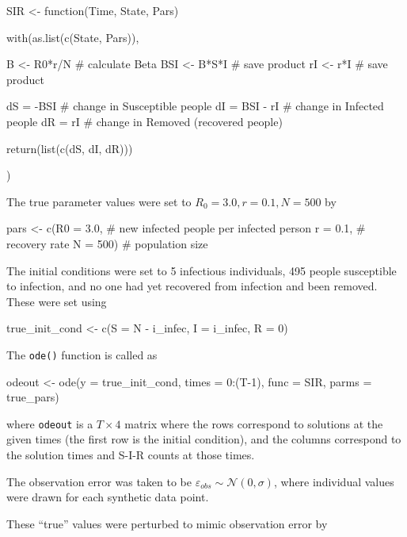     \begin{R}    
    SIR <- function(Time, State, Pars) {

        with(as.list(c(State, Pars)), {
            
            B   <- R0*r/N    # calculate Beta
            BSI <- B*S*I     # save product
            rI  <- r*I       # save product
            
            dS = -BSI       # change in Susceptible people
            dI = BSI - rI   # change in Infected people
            dR = rI         # change in Removed (recovered people)
            
            return(list(c(dS, dI, dR)))
            
        })
        
    }
    \end{R}

    The true parameter values were set to $R_0 = 3.0, r = 0.1, N = 500$ by

    \begin{R}
    pars  <- c(R0  = 3.0,  # new infected people per infected person
              r   = 0.1,  # recovery rate
              N   = 500)  # population size
    \end{R}

    The initial conditions were set to 5 infectious individuals, 495 people susceptible to infection, and no one had yet recovered from infection and been removed. These were set using

    \begin{R}
	true_init_cond <- c(S = N - i_infec,
                	   I = i_infec,
                	   R = 0)
    \end{R}

    The \verb|ode()| function is called as

    \begin{R}
    odeout <- ode(y = true_init_cond, times = 0:(T-1), func = SIR, parms = true_pars)
    \end{R}

    where \verb|odeout| is a $T \times 4$ matrix where the rows correspond to solutions at the given times (the first row is the initial condition), and the columns correspond to the solution times and S-I-R counts at those times.

    The observation error was taken to be $\varepsilon_{obs} \sim \mathcal{N}(0,\sigma)$, where individual values were drawn for each synthetic data point.

    These ``true'' values were perturbed to mimic observation error by

